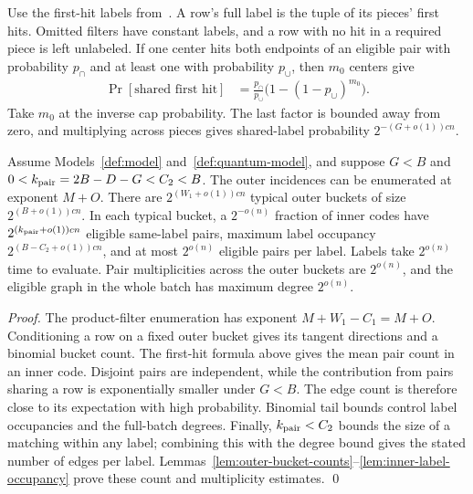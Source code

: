 \documentclass[runningheads,envcountsame,envcountsect,orivec]{llncs}
\begin{document}
Use the first-hit labels from~\cite[Section~3, Algorithm~1]{AINR14}.
A row's full label is the tuple of its pieces' first hits. Omitted filters have
constant labels, and a row with no hit in a required piece is
left unlabeled. If one center hits both endpoints of an
eligible pair with probability $p_{\cap}$ and at least one
with probability $p_{\cup}$, then $m_0$ centers give
\begin{align}
 \Pr[\text{shared first hit}]
 &=\frac{p_{\cap}}{p_{\cup}}
        \bigl(1-(1-p_{\cup})^{m_0}\bigr).
 \label{q:first-hit}
\end{align}
Take $m_0$ at the inverse cap probability. The last factor is
bounded away from zero, and multiplying across pieces gives
shared-label probability $2^{-(G+o(1))cn}$.

\begin{lemma}
\label{lem:quantum-label-counts}
Assume Models~\ref{def:model} and~\ref{def:quantum-model}, and
suppose $G<B$ and
$0<k_{\rm pair}=2B-D-G<C_2<B$.
The outer incidences can be enumerated at exponent $M+O$.
There are $2^{(W_1+o(1))cn}$ typical outer buckets of size
$2^{(B+o(1))cn}$. In each typical bucket, a
$2^{-o(n)}$ fraction of inner codes have
$2^{(k_{\rm pair}+o(1))cn}$ eligible same-label pairs,
maximum label occupancy $2^{(B-C_2+o(1))cn}$, and at most
$2^{o(n)}$ eligible pairs per label. Labels take
$2^{o(n)}$ time to evaluate. Pair multiplicities across the
outer buckets are $2^{o(n)}$, and the eligible graph in the
whole batch has maximum degree $2^{o(n)}$.
\end{lemma}

\begin{proof}
The product-filter enumeration has exponent $M+W_1-C_1=M+O$.
Conditioning a row on a fixed outer bucket gives its tangent
directions and a binomial bucket count. The first-hit formula
above gives the mean pair count in an inner code. Disjoint
pairs are independent, while the contribution from pairs
sharing a row is exponentially smaller under $G<B$.
The edge count is therefore close to its expectation with high
probability. Binomial tail bounds control
label occupancies and the full-batch degrees. Finally,
$k_{\rm pair}<C_2$ bounds the size of a matching within any
label; combining this with the degree bound gives the stated
number of edges per label. Lemmas~\ref{lem:outer-bucket-counts}--\ref{lem:inner-label-occupancy}
prove these count and multiplicity estimates.
\qed
\end{proof}
\end{document}
